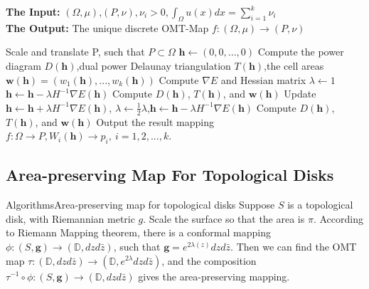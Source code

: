 \documentclass{beamer}
\theoremstyle{definition}
\begin{document}
\begin{frame}
\begin{algorithm}[H]
\begin{algorithmic}[1]
	\REQUIRE \textbf{The Input:} $(\Omega,\mu)$,$(P,\nu),\nu_i>0,\int_\Omega u(x)dx=\sum^k_{i=1}\nu_i$ \\
	\textbf{The Output:} The unique discrete OMT-Map $f:(\Omega,\mu)\rightarrow(P,\nu)$
	
  	\STATE Scale and translate P, such that $P\subset \Omega$
  	\STATE $\mathbf{h}\leftarrow(0,0,...,0)$
  	\STATE Compute the power diagram $D(\mathbf{h})$,dual power Delaunay triangulation $T(\mathbf{h})$,the cell areas $\mathbf{w}(\mathbf{h})=(w_1(\mathbf{h}),...,w_k(\mathbf{h}))$
  	\STATE Compute $\nabla E$ and Hessian matrix
  	\STATE $\lambda\leftarrow 1$
  	\STATE $\mathbf{h}\leftarrow \mathbf{h}-\lambda H^{-1}\nabla E(\mathbf{h})$
  	\STATE Compute $D(\mathbf{h})$, $T(\mathbf{h})$, and $\mathbf{w}(\mathbf{h})$
  		\STATE Update $\mathbf{h}\leftarrow \mathbf{h}+\lambda H^{-1}\nabla E(\mathbf{h})$, $\lambda\leftarrow\frac{1}{2}\lambda$,$\mathbf{h}\leftarrow \mathbf{h}-\lambda H^{-1}\nabla E(\mathbf{h})$
  		\STATE Compute $D(\mathbf{h})$, $T(\mathbf{h})$, and $\mathbf{w}(\mathbf{h})$
  		\ENDWHILE
  	\ENDWHILE
  	\STATE Output the result mapping $f:\Omega\rightarrow P, W_i(\mathbf{h})\rightarrow p_i,\ i=1,2,...,k.$
\end{algorithmic}
\caption{Optimal Mass Transport Map}
\label{algo:DOMT}
\end{algorithm}
\end{frame}

\subsection{Area-preserving Map For Topological Disks}
\begin{frame}{Algorithms}{Area-preserving map for topological disks}
Suppose $S$ is a topological disk, with Riemannian metric $g$. Scale the surface so that the area is $\pi$. According to Riemann Mapping theorem, there is a conformal mapping $\phi :(S,\mathbf{g})\rightarrow(\mathbb{D},dzd\bar{z})$, such that $\mathbf{g}= e^{2\lambda(z)}dzd\bar{z}$. Then we can find the OMT map $\tau:(\mathbb{D},dzd\bar{z})\rightarrow (\mathbb{D},e^{2\lambda}dzd\bar{z})$, and the composition $\tau^{-1}\circ \phi:(S,\mathbf{g})\rightarrow(\mathbb{D},dzd\bar{z})$ gives the area-preserving mapping.
\end{frame}
\end{document}
